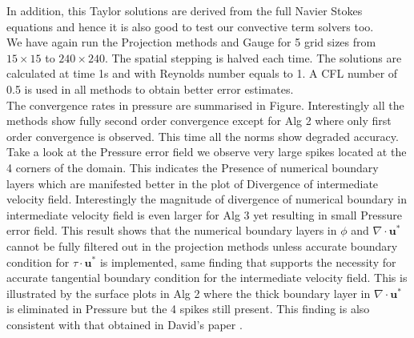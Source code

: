 In addition, this Taylor solutions are derived from the full Navier Stokes equations and hence it is also good to test our convective term solvers too.\\

We have again run the Projection methods and Gauge for 5 grid sizes from $15 \times 15$ to $240 \times 240$. The spatial stepping is halved each time. The solutions are calculated at time 1s and with Reynolds number equals to 1. A CFL number of 0.5 is used in all methods to obtain better error estimates.\\

The convergence rates in pressure are summarised in Figure. Interestingly all the methods show fully second order convergence except for Alg 2 where only first order convergence is observed. This time all the norms show degraded accuracy. Take a look at the Pressure error field we observe very large spikes located at the 4 corners of the domain. This indicates the Presence of numerical boundary layers which are manifested better in the plot of Divergence of intermediate velocity field. Interestingly the magnitude of divergence of numerical boundary in intermediate velocity field is even larger for Alg 3 yet resulting in small Pressure error field. This result shows that the numerical boundary layers in $\phi$ and $\nabla \cdot \textbf{u}^*$ cannot be fully filtered out in the projection methods unless accurate boundary condition for $\textbf{$\tau$} \cdot \textbf{u}^*$ is implemented, same finding that supports the necessity for accurate tangential boundary condition for the intermediate velocity field. This is illustrated by the surface plots in Alg 2 where the thick boundary layer in $\nabla \cdot \textbf{u}^*$ is eliminated in Pressure but the 4 spikes still present. This finding is also consistent with that obtained in David's paper \cite{brown2001accurate}.\\

